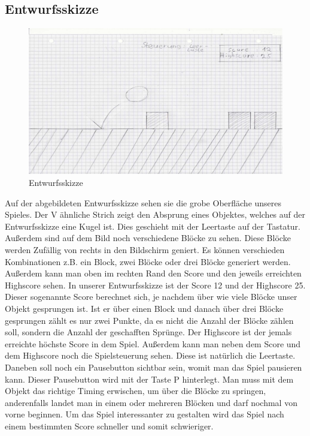 \subsection{Entwurfsskizze}
\begin{figure}[htb]
	\centering
	\includegraphics[scale=0.22]{content/pictures/entwurfsskizze.png}
	\caption{Entwurfsskizze}
\end{figure}
\noindent
Auf der abgebildeten Entwurfsskizze sehen sie die grobe Oberfläche unseres Spieles. Der V ähnliche Strich zeigt den Absprung eines Objektes, welches auf der Entwurfsskizze eine Kugel ist. Dies geschieht mit der Leertaste auf der Tastatur. Außerdem sind auf dem Bild noch verschiedene Blöcke zu sehen. Diese Blöcke werden Zufällig von rechts in den Bildschirm geniert. Es können verschieden Kombinationen z.B. ein Block, zwei Blöcke oder drei Blöcke generiert werden. Außerdem kann man oben im rechten Rand den Score und den jeweils erreichten Highscore sehen. In unserer Entwurfsskizze ist der Score 12 und der Highscore 25. Dieser sogenannte Score berechnet sich, je nachdem über wie viele Blöcke unser Objekt gesprungen ist. Ist er über einen Block und danach über drei Blöcke gesprungen zählt es nur zwei Punkte, da es nicht die Anzahl der Blöcke zählen soll, sondern die Anzahl der geschafften Sprünge. Der Highscore ist der jemals erreichte höchste Score in dem Spiel. Außerdem kann man neben dem Score und dem Highscore noch die Spielsteuerung sehen. Diese ist natürlich die Leertaste. Daneben soll noch ein Pausebutton sichtbar sein, womit man das Spiel pausieren kann. Dieser Pausebutton wird mit der Taste P hinterlegt. Man muss mit dem Objekt das richtige Timing erwischen, um über die Blöcke zu springen, anderenfalls landet man in einem oder mehreren Blöcken und darf nochmal von vorne beginnen. Um das Spiel interessanter zu gestalten wird das Spiel nach einem bestimmten Score schneller und somit schwieriger.
\newpage
